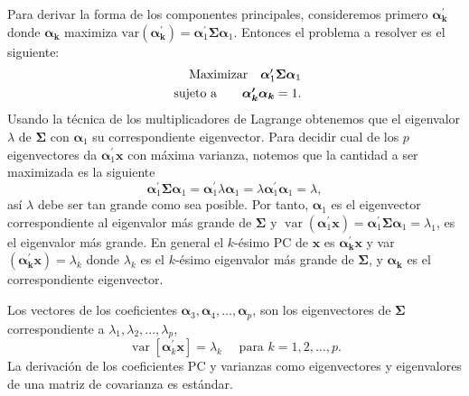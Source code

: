 Para derivar la forma de los componentes principales, consideremos primero $\boldsymbol{\alpha_k^\prime}$ donde $\boldsymbol{\alpha_k}$ maximiza $\mbox{var$(\boldsymbol{\alpha_k^\prime})= \boldsymbol{\alpha}_{1}^{\prime} \boldsymbol{\Sigma} \boldsymbol{\alpha}_{1}$}$. Entonces el problema a resolver es el siguiente:
\[
\begin{array}{r@{}r@{}r@{}l}
	\text{Maximizar} \quad \boldsymbol{\alpha}_{1}^{\prime} \boldsymbol{\Sigma} \boldsymbol{\alpha}_{1} \\[\jot]
	\text{sujeto a}\qquad \boldsymbol{\alpha_k^\prime}\boldsymbol{\alpha_k}=1. \\
	
\end{array}
\]
Usando la técnica de los multiplicadores de Lagrange obtenemos que el eigenvalor $\lambda$ de $\boldsymbol{\Sigma}$ con $\boldsymbol{\alpha}_{1}$ su correspondiente eigenvector. Para decidir cual de los $p$ eigenvectores da $\boldsymbol{\alpha}_{1}^{\prime}\boldsymbol{x}$ con máxima varianza, notemos que la cantidad a ser maximizada es la siguiente
\[
\boldsymbol{\alpha}_{1}^{\prime} \boldsymbol{\Sigma} \boldsymbol{\alpha}_{1}=\boldsymbol{\alpha}_{1}^{\prime} \lambda \boldsymbol{\alpha}_{1}=\lambda \boldsymbol{\alpha}_{1}^{\prime} \boldsymbol{\alpha}_{1}=\lambda,
\]
así $\lambda$ debe ser tan grande como sea posible. Por tanto, $\boldsymbol{\alpha}_{1}$ es el eigenvector correspondiente al eigenvalor más grande de $\boldsymbol{\Sigma}$ y $\operatorname{var}\left(\boldsymbol{\alpha}_{1}^{\prime} \mathbf{x}\right)=\boldsymbol{\alpha}_{1}^{\prime} \boldsymbol{\Sigma} \boldsymbol{\alpha}_{1}=\lambda_{1}$, es el eigenvalor más grande.
En general el $k$-ésimo PC de $\boldsymbol{x}$ es $ \boldsymbol{\alpha_k^\prime} \boldsymbol{x}$ y var$(\boldsymbol{\alpha_k^\prime}\boldsymbol{x})=\lambda_k$ donde $\lambda_k$ es el $k$-ésimo eigenvalor más grande de $\boldsymbol{\Sigma}$, y $\boldsymbol{\alpha_k}$ es el correspondiente eigenvector.

Los vectores de los coeficientes $\boldsymbol{\alpha}_{3}, \boldsymbol{\alpha}_{4}, \ldots, \boldsymbol{\alpha}_{p}$, son los eigenvectores de $\boldsymbol{\Sigma}$ correspondiente a $\lambda_{1},\lambda_{2},...,\lambda_{p}$,
\[
\operatorname{var}\left[\boldsymbol{\alpha}_{k}^{\prime} \mathbf{x}\right]=\lambda_{k} \quad \text { para } k=1,2, \ldots, p.
\]
La derivación de los coeficientes PC y varianzas como eigenvectores y eigenvalores de una matriz de covarianza es estándar. 


